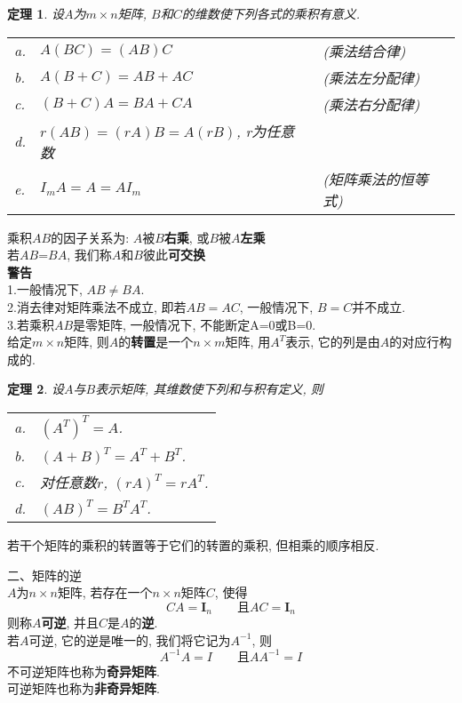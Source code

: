 \documentclass[UTF8,fontset=ubuntu]{ctexart}
\theoremstyle{plain}
\newtheorem{theorem}{定理}
\theoremstyle{nonumberplain}
\theoremstyle{empty}
\begin{document}
\begin{theorem}
设$A$为$m\times n$矩阵, $B$和$C$的维数使下列各式的乘积有意义.\\
\begin{tabular}{l@{\ }l l}
a. & $A(BC)=(AB)C$ & (乘法结合律)\\
b. & $A(B+C)=AB+AC$ & (乘法左分配律)\\
c. & $(B+C)A=BA+CA$ & (乘法右分配律)\\
d. & $r(AB)=(rA)B=A(rB)$, r为任意数 &\\
e. & $I_mA=A=AI_m$ & (矩阵乘法的恒等式)
\end{tabular}
\end{theorem}\vspace{2ex}

乘积$AB$的因子关系为: $A$被$B$\textbf{右乘}, 或$B$被$A$\textbf{左乘}\\
若$AB$=$BA$, 我们称$A$和$B$彼此\textbf{可交换}\\[2ex]

\textbf{警告}\\
1.一般情况下, $AB\neq BA$.\\
2.消去律对矩阵乘法不成立, 即若$AB=AC$, 一般情况下, $B=C$并不成立.\\
3.若乘积$AB$是零矩阵, 一般情况下, 不能断定A=0或B=0.\\[2ex]

给定$m\times n$矩阵, 则$A$的\textbf{转置}是一个$n\times m$矩阵, 用$A^T$表示, 它的列是由$A$的对应行构成的.\\[2ex]

\begin{theorem}
设$A$与$B$表示矩阵, 其维数使下列和与积有定义, 则\\
\begin{tabular}{l@{\ }l}
a. & $(A^T)^T=A$.\\
b. & $(A+B)^T=A^T+B^T$.\\
c. & 对任意数$r$, $(rA)^T=rA^T$.\\
d. & $(AB)^T=B^TA^T$.
\end{tabular}
\end{theorem}\vspace{2ex}

\begin{law}
若干个矩阵的乘积的转置等于它们的转置的乘积, 但相乘的顺序相反.
\end{law}\vspace{6ex}

二、矩阵的逆\\[1ex]
$A$为$n\times n$矩阵, 若存在一个$n\times n$矩阵$C$, 使得
\[CA=\bm{I}_n\qquad\text{且}AC=\bm{I}_n\]
则称$A$\textbf{可逆}, 并且$C$是$A$的\textbf{逆}.\\[2ex]
若$A$可逆, 它的逆是唯一的, 我们将它记为$A^{-1}$, 则
\[A^{-1}A=I\qquad\text{且}AA^{-1}=I\]
不可逆矩阵也称为\textbf{奇异矩阵}.\\
可逆矩阵也称为\textbf{非奇异矩阵}.\\[2ex]
\end{document}
